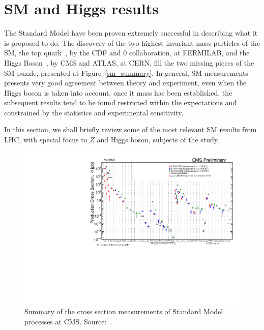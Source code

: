 \section{SM and Higgs results}
\label{section_sm_higgs}

The Standard Model have been proven extremely successful in describing what it is proposed to do. The discovery of the two highest invariant mass particles of the SM, the top quark~\cite{top_discovery_cdf,top_discovery_d0}, by the CDF and 0 collaboration, at FERMILAB, and the Higgs Boson~\cite{higgs_discovery_cms,higgs_discovery_atlas}, by CMS and ATLAS, at CERN, fill the two missing pieces of the SM puzzle, presented at Figure~\ref{sm_summary}. In general, SM measurements presents very good agreement between theory and experiment, even when the Higgs boson is taken into account, once it mass has been established, the subsequent results tend to be found restricted within the expectations and constrained by the statistics and experimental sensitivity.  

In this section, we shall briefly review some of the most relevant SM results from LHC, with special focus to $Z$ and Higgs boson, subjects of the study. 


\begin{figure}
  \centering
  \includegraphics[width=\textwidth]{figures_and_tables/theory/cms_sm_xsec.pdf}
  \caption{ Summary of the cross section measurements of Standard Model processes at CMS. Source:~\cite{cms_sm_xsec_summary}.}
  \label{cms_sm_xsec}
\end{figure}

